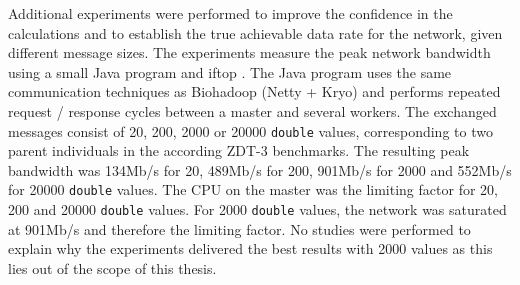  

Additional experiments were performed to improve the confidence in the calculations and to establish the true achievable data rate for the network, given different message sizes. The experiments measure the peak network bandwidth using a small Java program and iftop \cite{iftop}. The Java program uses the same communication techniques as Biohadoop (Netty + Kryo) and performs repeated request / response cycles between a master and several workers. The exchanged messages consist of 20, 200, 2000 or 20000 \texttt{double} values, corresponding to two parent individuals in the according ZDT-3 benchmarks. The resulting peak bandwidth was 134Mb/s for 20, 489Mb/s for 200, 901Mb/s for 2000 and 552Mb/s for 20000 \texttt{double} values. The CPU on the master was the limiting factor for 20, 200 and 20000 \texttt{double} values. For 2000 \texttt{double} values, the network was saturated at 901Mb/s and therefore the limiting factor. No studies were performed to explain why the experiments delivered the best results with 2000 values as this lies out of the scope of this thesis.

